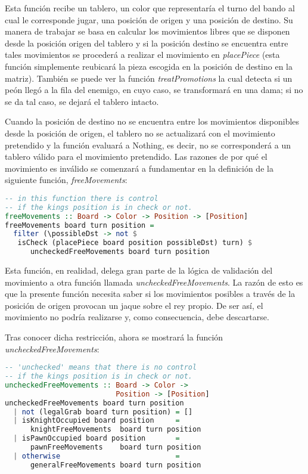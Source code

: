 \documentclass{llncs}
\begin{document}
Esta función recibe un tablero, un color que representaría el turno del bando al cual le corresponde jugar, una posición de origen y una posición de destino. Su manera de trabajar se basa en calcular los movimientos libres que se disponen desde la posición origen del tablero y si la posición destino se encuentra entre tales movimientos se procederá a realizar el movimiento en \textit{placePiece} (esta función simplemente reubicará la pieza escogida en la posición de destino en la matriz). También se puede ver la función \textit{treatPromotions} la cual detecta si un peón llegó a la fila del enemigo, en cuyo caso, se transformará en una dama; si no se da tal caso, se dejará el tablero intacto.

Cuando la posición de destino no se encuentra entre los movimientos disponibles desde la posición de origen, el tablero no se actualizará con el movimiento pretendido y la función evaluará a Nothing, es decir, no se corresponderá a un tablero válido para el movimiento pretendido. Las razones de por qué el movimiento es inválido se comenzará a fundamentar en la definición de la siguiente función, \textit{freeMovements}:


\begin{lstlisting}[frame=single, language=haskell, captionpos=b, caption=Función freeMovements, label={lst:free_movements}]
-- in this function there is control
-- if the kings position is in check or not.
freeMovements :: Board -> Color -> Position -> [Position]
freeMovements board turn position =
  filter (\possibleDst -> not $
   isCheck (placePiece board position possibleDst) turn) $
      uncheckedFreeMovements board turn position
\end{lstlisting}

Esta función, en realidad, delega gran parte de la lógica de validación del movimiento a otra función llamada \textit{uncheckedFreeMovements}. La razón de esto es que la presente función necesita saber si los movimientos posibles a través de la posición de origen provocan un jaque sobre el rey propio. De ser así, el movimiento no podría realizarse y, como consecuencia, debe descartarse.

Tras conocer dicha restricción, ahora se mostrará la función \textit{uncheckedFreeMovements}:


\begin{lstlisting}[frame=single, language=haskell, captionpos=b, caption=Función uncheckedFreeMovements, label={lst:unchecked_free_movements}]
-- 'unchecked' means that there is no control
-- if the kings position is in check or not.
uncheckedFreeMovements :: Board -> Color ->
                          Position -> [Position]
uncheckedFreeMovements board turn position
  | not (legalGrab board turn position) = []
  | isKnightOccupied board position     =
      knightFreeMovements  board turn position
  | isPawnOccupied board position       =
      pawnFreeMovements    board turn position
  | otherwise                           =
      generalFreeMovements board turn position
\end{lstlisting}
\end{document}
